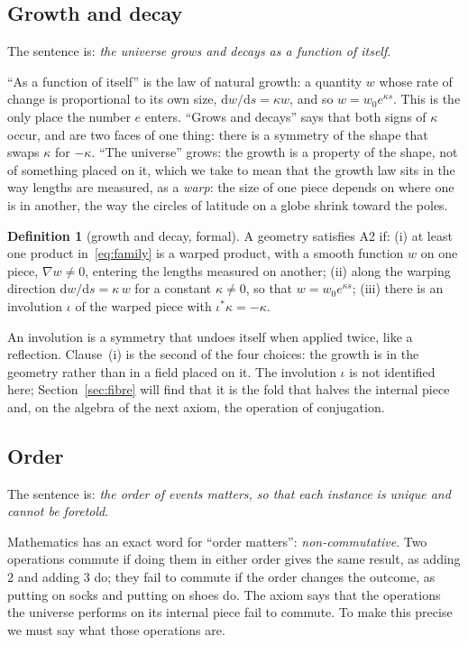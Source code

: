 \documentclass[11pt,a4paper]{article}
\theoremstyle{plain}
\theoremstyle{definition}
\newtheorem{definition}[theorem]{Definition}
\theoremstyle{remark}
\begin{document}
\subsection{Growth and decay}\label{sec:A2}

The sentence is: \emph{the universe grows and decays as a function of itself}.

``As a function of itself'' is the law of natural growth: a quantity $w$ whose rate of change is proportional to its own size, $\mathrm{d}w/\mathrm{d}s=\kappa w$, and so $w=w_{0}e^{\kappa s}$. This is the only place the number $e$ enters. ``Grows and decays'' says that both signs of $\kappa$ occur, and are two faces of one thing: there is a symmetry of the shape that swaps $\kappa$ for $-\kappa$. ``The universe'' grows: the growth is a property of the shape, not of something placed on it, which we take to mean that the growth law sits in the way lengths are measured, as a \emph{warp}: the size of one piece depends on where one is in another, the way the circles of latitude on a globe shrink toward the poles.

\begin{definition}[growth and decay, formal]\label{def:A2}
A geometry satisfies A2 if: (i) at least one product in~\eqref{eq:family} is a warped product, with a smooth function $w$ on one piece, $\nabla w\neq0$, entering the lengths measured on another; (ii) along the warping direction $\mathrm{d}w/\mathrm{d}s=\kappa\,w$ for a constant $\kappa\neq0$, so that $w=w_{0}e^{\kappa s}$; (iii) there is an involution $\iota$ of the warped piece with $\iota^{*}\kappa=-\kappa$.
\end{definition}

An involution is a symmetry that undoes itself when applied twice, like a reflection. Clause~(i) is the second of the four choices: the growth is in the geometry rather than in a field placed on it. The involution $\iota$ is not identified here; Section~\ref{sec:fibre} will find that it is the fold that halves the internal piece and, on the algebra of the next axiom, the operation of conjugation.

\subsection{Order}\label{sec:A3}

The sentence is: \emph{the order of events matters, so that each instance is unique and cannot be foretold}.

Mathematics has an exact word for ``order matters'': \emph{non-commutative}. Two operations commute if doing them in either order gives the same result, as adding $2$ and adding $3$ do; they fail to commute if the order changes the outcome, as putting on socks and putting on shoes do. The axiom says that the operations the universe performs on its internal piece fail to commute. To make this precise we must say what those operations are.
\end{document}
